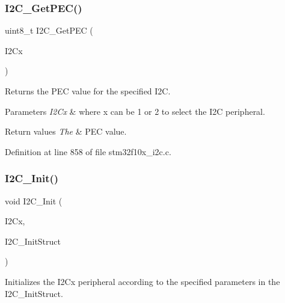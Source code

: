 \subsubsection{\texorpdfstring{I2\+C\+\_\+\+Get\+P\+E\+C()}{I2C\_GetPEC()}}
{\footnotesize\ttfamily uint8\+\_\+t I2\+C\+\_\+\+Get\+P\+EC (\begin{DoxyParamCaption}\item[{\hyperlink{struct_i2_c___type_def}{I2\+C\+\_\+\+Type\+Def} $\ast$}]{I2\+Cx }\end{DoxyParamCaption})}



Returns the P\+EC value for the specified I2C. 


\begin{DoxyParams}{Parameters}
{\em I2\+Cx} & where x can be 1 or 2 to select the I2C peripheral. \\
\hline
\end{DoxyParams}

\begin{DoxyRetVals}{Return values}
{\em The} & P\+EC value. \\
\hline
\end{DoxyRetVals}


Definition at line 858 of file stm32f10x\+\_\+i2c.\+c.

\mbox{\label{group___i2_c___exported___functions_gaac29465bca70fbc91c2f922ab67bb88e}} 
\subsubsection{\texorpdfstring{I2\+C\+\_\+\+Init()}{I2C\_Init()}}
{\footnotesize\ttfamily void I2\+C\+\_\+\+Init (\begin{DoxyParamCaption}\item[{\hyperlink{struct_i2_c___type_def}{I2\+C\+\_\+\+Type\+Def} $\ast$}]{I2\+Cx,  }\item[{\hyperlink{struct_i2_c___init_type_def}{I2\+C\+\_\+\+Init\+Type\+Def} $\ast$}]{I2\+C\+\_\+\+Init\+Struct }\end{DoxyParamCaption})}



Initializes the I2\+Cx peripheral according to the specified parameters in the I2\+C\+\_\+\+Init\+Struct. 


